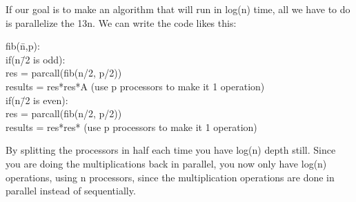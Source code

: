 \documentclass{article}
\begin{document}
\begin{enumerate}
If our goal is to make an algorithm that will run in log(n) time, all we have to do is parallelize the 13n. We can write the code likes this:
\begin{tabbing}
fib(\=n,p):\\
\>if(n\=/2 is odd):\\
\>\>res = parcall(fib(n/2, p/2))\\
\>\>results = res*res*A (use p processors to make it 1 operation) \\
\>if(n\=/2 is even):\\
\>\>res = parcall(fib(n/2, p/2))\\
\>\>results = res*res* (use p processors to make it 1 operation) \\
\end{tabbing}
By splitting the processors in half each time you have log(n) depth still. Since you are doing the multiplications back in parallel, you now only have log(n) operations, using n processors, since the multiplication operations are done in parallel instead of sequentially.
\end{enumerate}
\end{document}
